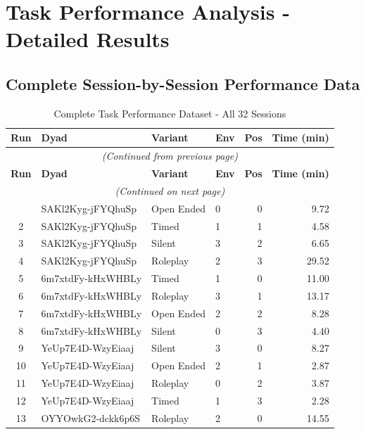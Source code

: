 \section{Task Performance Analysis - Detailed Results}
\label{appendix:completion_time_results}

\subsection{Complete Session-by-Session Performance Data}

\begin{longtable}{clllrr}
\caption{Complete Task Performance Dataset - All 32 Sessions}
\label{tab:all_completion_times} \\
\toprule
\textbf{Run} & \textbf{Dyad} & \textbf{Variant} & \textbf{Env} & \textbf{Pos} & \textbf{Time (min)} \\
\midrule
\endfirsthead
\multicolumn{6}{c}{\textit{(Continued from previous page)}} \\
\toprule
\textbf{Run} & \textbf{Dyad} & \textbf{Variant} & \textbf{Env} & \textbf{Pos} & \textbf{Time (min)} \\
\midrule
\endhead
\midrule
\multicolumn{6}{c}{\textit{(Continued on next page)}} \\
\endfoot
\bottomrule
\endlastfoot
1 & SAKl2Kyg-jFYQhuSp & Open Ended & 0 & 0 & 9.72 \\
2 & SAKl2Kyg-jFYQhuSp & Timed & 1 & 1 & 4.58 \\
3 & SAKl2Kyg-jFYQhuSp & Silent & 3 & 2 & 6.65 \\
4 & SAKl2Kyg-jFYQhuSp & Roleplay & 2 & 3 & 29.52 \\
5 & 6m7xtdFy-kHxWHBLy & Timed & 1 & 0 & 11.00 \\
6 & 6m7xtdFy-kHxWHBLy & Roleplay & 3 & 1 & 13.17 \\
7 & 6m7xtdFy-kHxWHBLy & Open Ended & 2 & 2 & 8.28 \\
8 & 6m7xtdFy-kHxWHBLy & Silent & 0 & 3 & 4.40 \\
9 & YeUp7E4D-WzyEiaaj & Silent & 3 & 0 & 8.27 \\
10 & YeUp7E4D-WzyEiaaj & Open Ended & 2 & 1 & 2.87 \\
11 & YeUp7E4D-WzyEiaaj & Roleplay & 0 & 2 & 3.87 \\
12 & YeUp7E4D-WzyEiaaj & Timed & 1 & 3 & 2.28 \\
13 & OYYOwkG2-dckk6p6S & Roleplay & 2 & 0 & 14.55 \\

\end{longtable}
